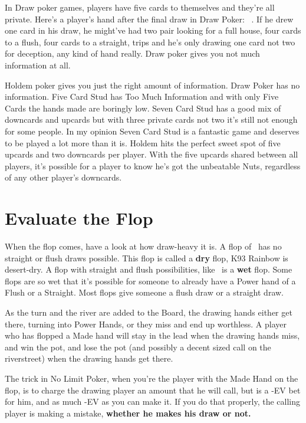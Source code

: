 In Draw poker games, players have five cards to themselves and they're
all private. Here's a player's hand after the final draw in Draw
Poker: \back\back\back\back\back\ . If he drew one card in his draw,
he might've had two pair looking for a full house, four cards to a
flush, four cards to a straight, trips and he's only drawing one card
not two for deception, any kind of hand really. Draw poker gives you
not much information at all.

Holdem poker gives you just the right amount of information. Draw
Poker has no information. Five Card Stud has Too Much Information and
with only Five Cards the hands made are boringly low. Seven Card Stud
has a good mix of downcards and upcards but with three private cards
not two it's still not enough for some people. In my opinion Seven
Card Stud is a fantastic game and deserves to be played a lot more
than it is. Holdem hits the perfect sweet spot of five upcards and two
downcards per player. With the five upcards shared between all
players, it's possible for a player to know he's got the unbeatable
Nuts, regardless of any other player's downcards.

\section{Evaluate the Flop}

When the flop comes, have a look at how draw-heavy it is. A flop of
\Ks\nineh\trec\ has no straight or flush draws possible. This flop is
called a \textbf{dry} flop, K93 Rainbow is desert-dry. A flop with
straight and flush possibilities, like \tend\nined\sixh\ is a
\textbf{wet} flop. Some flops are so wet that it's possible for
someone to already have a Power hand of a Flush or a Straight. Most
flops give someone a flush draw or a straight draw.

As the turn and the river are added to the Board, the drawing hands
either get there, turning into Power Hands, or they miss and end up
worthless. A player who has flopped a Made hand will stay in the lead
when the drawing hands miss, and win the pot, and lose the pot (and
possibly a decent sized call on the riverstreet) when the
drawing hands get there.

The trick in No Limit Poker, when you're the player with the Made Hand
on the flop, is to charge the drawing player an amount that he will
call, but is a -EV bet for him, and as much -EV as you can make it. If
you do that properly, the calling player is making a mistake,
\textbf{whether he makes his draw or not.}

